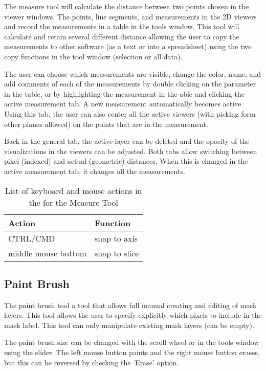 \documentclass[fleqn,11pt,openany]{book}
\begin{document}
The measure tool will calculate the distance between two points chosen in the viewer windows.  The points, line segments, and measurements in the 2D viewers and record the measurements in a table in the tools window.   This tool will calculate and retain several different distance allowing the user to copy the measurements to other software (as a text or into a spreadsheet) using the two copy functions in the tool window (selection or all data).  

The user can choose which measurements are visible, change the color, name, and add comments of each of the measurements by double clicking on the parameter in the table, or by highlighting the measurement in the able and clicking the active measurement tab.  A new measurement automatically becomes active.  Using this tab, the user can also center all the active viewers (with picking form other planes allowed) on the points that are in the measurement.  

Back in the general tab, the active layer can be deleted and the opacity of the visualizations in the viewers can be adjusted.  Both tabs allow switching between pixel (indexed) and actual (geometric) distances.  When this is changed in the active measurement tab, it changes all the measurements.  

\begin{table}[h!]
\label{tab:measurekey}
\caption{List of keyboard and mouse actions in the for the Measure Tool}
\begin{tabular}{|l|l|}
\hline
{\bf Action} & {\bf Function}\\
\hline
CTRL/CMD & snap to axis\\
\hline
middle mouse buttom & snap to slice\\
\hline
\end{tabular}
\end{table}


\subsection{Paint Brush}

The paint brush tool a tool that allows full manual creating and editing of mask layers.  This tool allows the user to specify explicitly which pixels to include in the mask label.  This tool can only manipulate existing mask layers (can be empty).   

The paint brush size can be changed with the scroll wheel or in the tools window using the slider.   The left mouse button paints and the right mouse button erases, but this can be reversed by checking the `Erase' option.  
\end{document}
